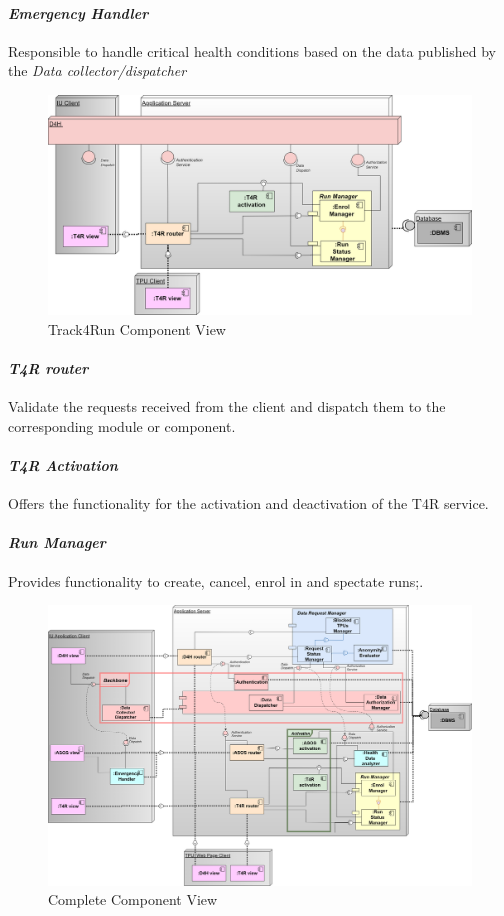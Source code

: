 \paragraph{\textit{Emergency Handler}} Responsible to handle critical health conditions based on the data published by the \textit{Data collector/dispatcher}
\begin{figure}[H]
\caption{Track4Run Component View}
\centering
\includegraphics[width = \textwidth]{sections/architecturalDesign/T4RDiagram.png}
\end{figure}
\paragraph{\textit{T4R router}} Validate the requests received from the client and dispatch them to the corresponding module or component.
\paragraph{\textit{T4R Activation}} Offers the functionality for the activation and deactivation of the T4R service.
\paragraph{\textit{Run Manager}} Provides functionality to create, cancel, enrol in and spectate runs;.
\begin{figure}[H]
\caption{Complete Component View}
\centering
\includegraphics[width = \textwidth]{sections/architecturalDesign/ComponentDiagram.png}
\end{figure}

